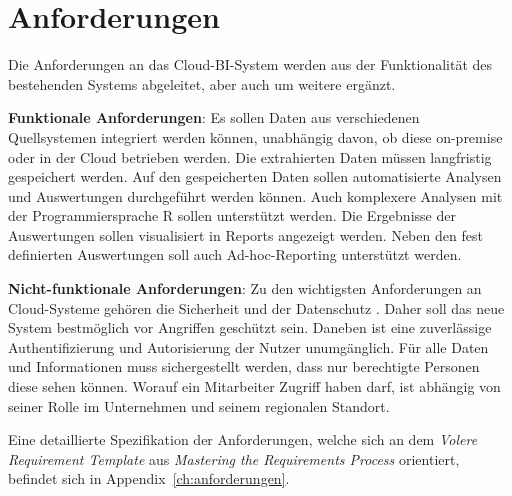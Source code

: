 \section{Anforderungen}
\label{sec:anforderungen}
Die Anforderungen an das Cloud-BI-System werden aus der Funktionalität des bestehenden Systems abgeleitet, aber auch um weitere ergänzt. 

\textbf{Funktionale Anforderungen}: Es sollen Daten aus verschiedenen Quellsystemen integriert werden können, unabhängig davon, ob diese on-premise oder in der Cloud betrieben werden. Die extrahierten Daten müssen langfristig gespeichert werden. Auf den gespeicherten Daten sollen automatisierte Analysen und Auswertungen durchgeführt werden können. Auch komplexere Analysen mit der Programmiersprache R sollen unterstützt werden. Die Ergebnisse der Auswertungen sollen visualisiert in Reports angezeigt werden. Neben den fest definierten Auswertungen soll auch Ad-hoc-Reporting unterstützt werden. 

\textbf{Nicht-funktionale Anforderungen}: Zu den wichtigsten Anforderungen an Cloud-Systeme gehören die Sicherheit und der Datenschutz \cite{gurjar_cloud_2013}. Daher soll das neue System bestmöglich vor Angriffen geschützt sein. Daneben ist eine zuverlässige Authentifizierung und Autorisierung der Nutzer unumgänglich. Für alle Daten und Informationen muss sichergestellt werden, dass nur berechtigte Personen diese sehen können. Worauf ein Mitarbeiter Zugriff haben darf, ist abhängig von seiner Rolle im Unternehmen und seinem regionalen Standort.

Eine detaillierte Spezifikation der Anforderungen, welche sich an dem \textit{Volere Requirement Template} aus \textit{Mastering the Requirements Process} \cite{robertson_mastering_2013} orientiert, befindet sich in Appendix~\ref{ch:anforderungen}.